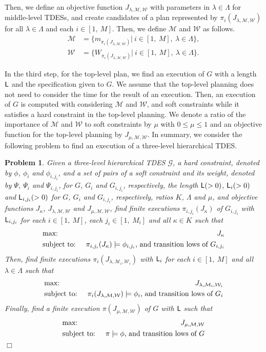 \documentclass[journal,twoside,web]{IEEEtran}
\newcommand{\qedwhite}{\hfill \ensuremath{\Box}}
\newtheorem{pbm}{Problem}
\newcommand{\Len}{{\sf L}}
\newcommand{\M}{\mathcal{M}}
\newcommand{\W}{\mathcal{W}}
\begin{document}
Then, we define an objective function $J_{\lambda,\M,\W}$ with parameters in $\lambda\in\Lambda$ for middle-level TDESs, and create candidates of a plan represented by $\pi_{i}(J_{\lambda,\M,\W})$ for all $\lambda\in\Lambda$ and each $i\in[1,~M]$.
Then, we define $\mathcal{M}$ and $\mathcal{W}$ as follows.
\begin{align}
\mathcal{M}&=\{m_{\pi_{i}(J_{\lambda,\M,\W})}|~i\in[1,~M],~\lambda\in \Lambda\},\\
\mathcal{W}&=\{W_{\pi_{i}(J_{\lambda,\M,\W})}|~i\in[1,~M],~\lambda\in \Lambda\}.
\end{align}
%

In the third step, for the top-level plan, we find an execution of $G$ with a length $\Len$ and the specification given to $G$.
We assume that the top-level planning does not need to consider the time for the result of an execution.
Then, an execution of $G$ is computed with considering $\M$ and $\W$, and soft constraints while it satisfies a hard constraint in the top-level planning.
We denote a ratio of the importance of $\M$ and $\W$ to soft constraints by $\mu$ with $0\leq\mu\leq1$ and an objective function for the top-level planning by $J_{\mu,\M,\W}$.
%
In summary, we consider the following problem to find an execution of a three-level hierarchical TDES.
\begin{pbm}\label{pbm3}
Given a three-level hierarchical TDES $\mathcal{G}$, a hard constraint, denoted by $\phi$, $\phi_i$ and $\phi_{i,{j_i}}$, and a set of pairs of a soft constraint and its weight, denoted by $\Psi$, $\Psi_i$ and $\Psi_{i,{j_i}}$, for $G$, $G_i$ and $G_{i,{j_i}}$, respectively, the length $\Len(>0)$, $\Len_i(>0)$ and $\Len_{i,{j_i}}(>0)$ for $G$,  $G_i$ and $G_{i,{j_i}}$, respectively, ratios $K$, $\Lambda$ and $\mu$, and objective functions $J_\kappa$, $J_{\lambda,\M,\W}$ and $J_{\mu,\M,\W}$,
find finite executions $\pi_{i,{j_i}}(J_\kappa)$ of $G_{i,{j_i}}$ with $\Len_{i,{j_i}}$ for each $i\in[1,~M]$, each $j_i\in[1,~M_i]$ and all $\kappa\in K$ such that
\begin{eqnarray}
&\mbox{max: }&J_\kappa \notag \\
&\mbox{subject to: }&\pi_{i,{j_i}}(J_\kappa)\models \phi_{i,{j_i}}\mbox{, and transition lows of }G_{i,{j_i}}\notag 
\end{eqnarray}
Then, find finite executions $\pi_i(J_{\lambda,\M_i,\W_i})$ with $\Len_i$ for each $i\in[1,~M]$ and all $\lambda\in\Lambda$ such that
\begin{eqnarray}
&\mbox{max: }&J_{\lambda,\M_i,\W_i}\notag \\
&\mbox{subject to: }&\pi_i(J_{\lambda,\M,\W})\models \phi_i\mbox{, and transition lows of }G_i\notag 
\end{eqnarray}
Finally, find a finite execution $\pi(J_{\mu,\M,\W})$ of $G$ with $\Len$ such that
\begin{eqnarray}
&\mbox{max: }&J_{\mu,\M,\W}\notag \\
&\mbox{subject to: }&\pi\models \phi\mbox{, and transition lows of }G\notag 
\end{eqnarray}
\qedwhite
\end{pbm}
\end{document}
